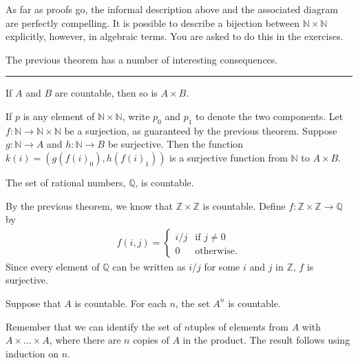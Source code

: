 \documentclass[letterpaper,10pt,english]{sphinxmanual}
\begin{document}
\sphinxAtStartPar
As far as proofs go, the informal description above and the associated diagram are perfectly compelling. It is possible to describe a bijection between \(\mathbb{N} \times \mathbb{N}\) explicitly, however, in algebraic terms. You are asked to do this in the exercises.

\sphinxAtStartPar
The previous theorem has a number of interesting consequences.


\bigskip\hrule\bigskip


\sphinxAtStartPar
{} If \(A\) and \(B\) are countable, then so is \(A \times B\).

\sphinxAtStartPar
{} If \(p\) is any element of \(\mathbb{N} \times \mathbb{N}\), write \(p_0\) and \(p_1\) to denote the two components. Let \(f : \mathbb{N} \to \mathbb{N} \times \mathbb{N}\) be a surjection, as guaranteed by the previous theorem. Suppose \(g : \mathbb{N} \to A\) and \(h : \mathbb{N} \to B\) be surjective. Then the function \(k(i) = ( g(f(i)_0), h(f(i)_1) )\) is a surjective function from \(\mathbb{N}\) to \(A \times B\).

\sphinxAtStartPar
{} The set of rational numbers, \(\mathbb{Q}\), is countable.

\sphinxAtStartPar
{} By the previous theorem, we know that \(\mathbb{Z} \times \mathbb{Z}\) is countable. Define \(f : \mathbb{Z} \times \mathbb{Z} \to \mathbb{Q}\) by
\begin{equation*}
\begin{split}f(i,j) = \begin{cases}
           i / j & \mbox{if $j \neq 0$} \\
           0 & \mbox{otherwise.}
         \end{cases}\end{split}
\end{equation*}
\sphinxAtStartPar
Since every element of \(\mathbb{Q}\) can be written as \(i / j\) for some \(i\) and \(j\) in \(\mathbb{Z}\), \(f\) is surjective.

\sphinxAtStartPar
{} Suppose that \(A\) is countable. For each \(n\), the set \(A^n\) is countable.

\sphinxAtStartPar
{} Remember that we can identify the set of \(n\)\sphinxhyphen{}tuples of elements from \(A\) with \(A \times \ldots \times A\), where there are \(n\) copies of \(A\) in the product. The result follows using induction on \(n\).
\end{document}
